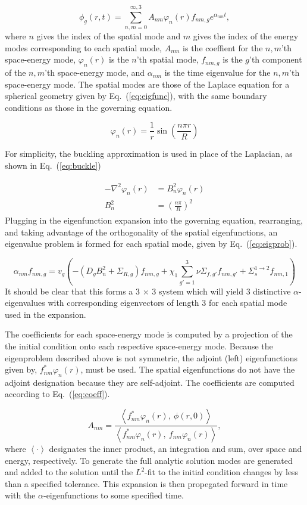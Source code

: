\documentclass[12pt]{article}
\newcommand{\fn}[1]{\left( #1 \right)}
\newcommand{\ave}[1]{\left\langle #1 \right\rangle}
\newcommand{\bea}{\begin{eqnarray}}
\newcommand{\eea}{\end{eqnarray}}
\newcommand{\be}{\begin{equation}}
\newcommand{\ee}{\end{equation}}
\newcommand{\LEQ}[1]{\label{eq:#1}}
\newcommand{\EQ}[1]{Eq.~(\ref{eq:#1})}
\begin{document}
\be
	\phi_g(r, t) = \sum_{n, m = 0}^{\infty, 3} A_{nm} \varphi_n(r) f_{nm, g} e^{\alpha_{nm} t},
\LEQ{exp} \ee
where $n$ gives the index of the spatial mode and $m$ gives the index of the energy modes corresponding to each spatial mode, $A_{nm}$ is the coeffient for the $n,m$'th space-energy mode, $\varphi_n(r)$ is the $n$'th spatial mode, $f_{nm, g}$ is the $g$'th component of the $n,m$'th space-energy mode, and $\alpha_{nm}$ is the time eigenvalue for the $n,m$'th space-energy mode. The spatial modes are those of the Laplace equation for a spherical geometry given by \EQ{eigfunc}, with the same boundary conditions as those in the governing equation.

\be
	\varphi_n(r) = \frac{1}{r} \sin\fn{ \frac{n \pi r}{R} }
\LEQ{eigfunc} \ee

For simplicity, the buckling approximation is used in place of the Laplacian, as shown in \EQ{buckle}

\bea \begin{aligned}
	- \nabla^2 \varphi_n(r) &= B_n^2 \varphi_n(r) \\
	B_n^2 &= \fn{ \frac{n \pi}{R} }^2
\end{aligned} \LEQ{buckle} \eea
Plugging in the eigenfunction expansion into the governing equation, rearranging, and taking advantage of the orthogonality of the spatial eigenfunctions, an eigenvalue problem is formed for each spatial mode, given by \EQ{eigprob}.

\be
	\alpha_{nm} f_{nm, g} = v_g \fn{ - \fn{ D_g B_n^2 + \Sigma_{R,g} }f_{nm, g} + \chi_1 \sum_{g' = 1}^{3} \nu\Sigma_{f,g'} f_{nm, g'} + \Sigma_s^{1 \rightarrow 2} f_{nm, 1} } 
\LEQ{eigprob} \ee
It should be clear that this forms a 3 $\times$ 3 system which will yield 3 distinctive $\alpha$-eigenvalues with corresponding eigenvectors of length 3 for each spatial mode used in the expansion.

The coefficients for each space-energy mode is computed by a projection of the the initial condition onto each respective space-energy mode. Because the eigenproblem described above is not symmetric, the adjoint (left) eigenfunctions given by, $f_{nm}^* \varphi_n(r)$, must be used. The spatial eigenfunctions do not have the adjoint designation because they are self-adjoint. The coefficients are computed according to \EQ{coeff}.

\be
	A_{nm} = \frac{\ave{ f_{nm}^* \varphi_n(r), \ \phi(r, 0)}}{\ave{f_{nm}^* \varphi_n(r), \ f_{nm} \varphi_n(r)}},
\LEQ{coeff} \ee
where $\ave{\cdot}$ designates the inner product, an integration and sum, over space and energy, respectively. To generate the full analytic solution modes are generated and added to the solution until the $L^2$-fit to the initial condition changes by less than a specified tolerance. This expansion is then propegated forward in time with the $\alpha$-eigenfunctions to some specified  time.
\end{document}
